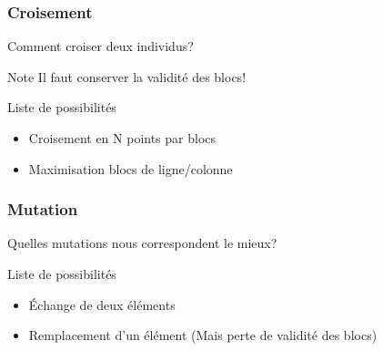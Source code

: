 \begin{frame}
    \frametitle{Croisement}
    Comment croiser deux individus?
    \pause
    \begin{exampleblock}{Note}
        Il faut conserver la validité des blocs!
    \end{exampleblock}
    \pause
    \begin{block}{Liste de possibilités}
        \begin{itemize}
            \pause
            \item Croisement en N points par blocs
            \pause
            \item Maximisation blocs de ligne/colonne
        \end{itemize}
    \end{block}
\end{frame}
\begin{frame}
    \frametitle{Mutation}
    Quelles mutations nous correspondent le mieux?
    \pause
    \begin{block}{Liste de possibilités}
        \begin{itemize}
            \pause
            \item Échange de deux éléments
            \pause
            \item Remplacement d'un élément (Mais perte de validité des blocs)
        \end{itemize}
    \end{block}
\end{frame}
